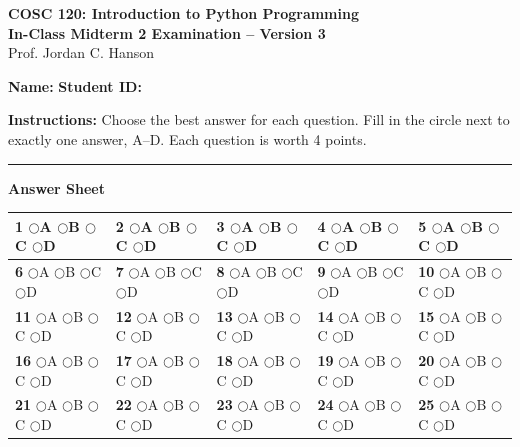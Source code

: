 \documentclass[11pt]{article}
\newcommand{\bubblecell}[1]{%
    {\scriptsize
    \textbf{#1}\;
    \(\bigcirc\)A\;
    \(\bigcirc\)B\;
    \(\bigcirc\)C\;
    \(\bigcirc\)D}%
}
\begin{document}
\begin{center}
{\Large\bfseries COSC 120: Introduction to Python Programming}\\[2pt]
{\large\bfseries In-Class Midterm 2 Examination -- Version 3}\\[3pt]
Prof. Jordan C. Hanson
\end{center}

\vspace{0.1cm}

\noindent
\textbf{Name:} \hrulefill
\hspace{0.5cm}
\textbf{Student ID:}
\fbox{\rule{0pt}{1.8ex}\hspace{4cm}}

\vspace{0.2cm}

\noindent
\textbf{Instructions:}
Choose the best answer for each question.
Fill in the circle next to exactly one answer, A--D.
Each question is worth 4 points.

\vspace{0.15cm}
\hrule
\vspace{0.2cm}

\begin{center}
{\large\bfseries Answer Sheet}
\end{center}

\small
\renewcommand{\arraystretch}{1.3}

\begin{center}
\begin{tabular}{
|m{}
|m{}
|m{}
|m{}
|m{}|}
\hline
\bubblecell{1} &
\bubblecell{2} &
\bubblecell{3} &
\bubblecell{4} &
\bubblecell{5} \\ \hline

\bubblecell{6} &
\bubblecell{7} &
\bubblecell{8} &
\bubblecell{9} &
\bubblecell{10} \\ \hline

\bubblecell{11} &
\bubblecell{12} &
\bubblecell{13} &
\bubblecell{14} &
\bubblecell{15} \\ \hline

\bubblecell{16} &
\bubblecell{17} &
\bubblecell{18} &
\bubblecell{19} &
\bubblecell{20} \\ \hline

\bubblecell{21} &
\bubblecell{22} &
\bubblecell{23} &
\bubblecell{24} &
\bubblecell{25} \\ \hline
\end{tabular}
\end{center}
\end{document}
